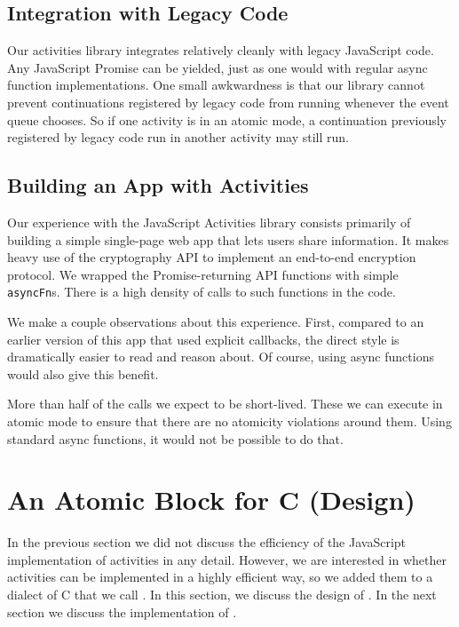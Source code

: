 \documentclass[acmsmall,anonymous,review]{acmart}\settopmatter{printfolios=true,printccs=false,printacmref=false}
\begin{document}
\subsection{Integration with Legacy Code}

Our activities library integrates relatively cleanly with legacy JavaScript code.
Any JavaScript Promise can be yielded, just as one would with regular async function implementations.
One small awkwardness is that our library cannot prevent continuations registered by legacy code from running whenever the event queue chooses.
So if one activity is in an atomic mode, a continuation previously registered by legacy code run in another activity may still run.

\subsection{Building an App with Activities}

Our experience with the JavaScript Activities library consists primarily of building a simple single-page web app that lets users share information.
It makes heavy use of the cryptography API to implement an end-to-end encryption protocol.
We wrapped the Promise-returning API functions with simple \texttt{asyncFn}s.
There is a high density of calls to such functions in the code.

We make a couple observations about this experience.
First, compared to an earlier version of this app that used explicit callbacks, the direct style is dramatically easier to read and reason about.
Of course, using async functions would also give this benefit.

More than half of the calls we expect to be short-lived.
These we can execute in atomic mode to ensure that there are no atomicity violations around them.
Using standard async functions, it would not be possible to do that.

\section{An Atomic Block for C (Design)}

In the previous section we did not discuss the efficiency of the JavaScript implementation of activities in any detail.
However, we are interested in whether activities can be implemented in a highly efficient way, so we added them to a dialect of C that we call \charcoal{}.
In this section, we discuss the design of \charcoal{}.
In the next section we discuss the implementation of \charcoal{}.
\end{document}
